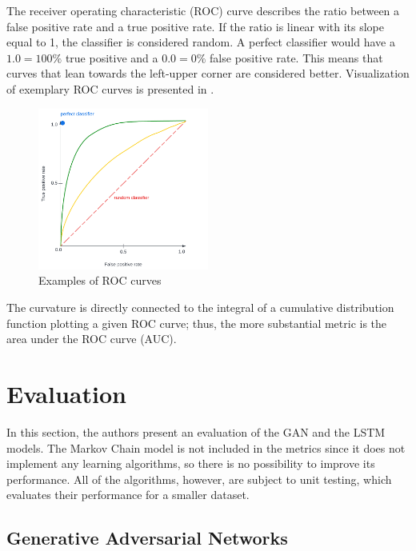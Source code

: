 \documentclass[a4paper, 11pt, twoside]{report}
\theoremstyle{definition}
\begin{document}
The receiver operating characteristic (ROC) curve describes the ratio between a false positive rate and a true positive rate. If the ratio is linear with its slope equal to 1, the classifier is considered random. A perfect classifier would have a $1.0 = 100\%$ true positive and a $0.0 = 0\%$ false positive rate. This means that curves that lean towards the left-upper corner are considered better. Visualization of exemplary ROC curves is presented in . \par

\begin{figure}[H]
    \centering
    \includegraphics[width=0.5\textwidth]{assets/ROC.png}
    \caption{Examples of ROC curves}
    \label{fig:ROC_curve}
\end{figure}

The curvature is directly connected to the integral of a cumulative distribution function plotting a given ROC curve; thus, the more substantial metric is the area under the ROC curve (AUC). \par


\section{Evaluation}

In this section, the authors present an evaluation of the GAN and the LSTM models. The Markov Chain model is not included in the metrics since it does not implement any learning algorithms, so there is no possibility to improve its performance. All of the algorithms, however, are subject to unit testing, which evaluates their performance for a smaller dataset. \par

\subsection{Generative Adversarial Networks}
\end{document}
